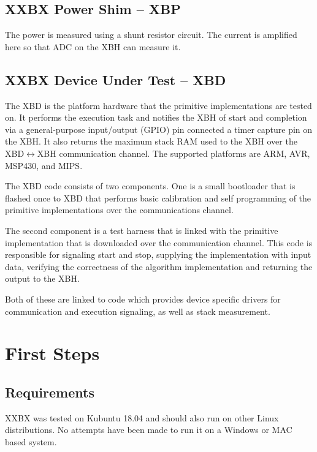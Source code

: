 \documentclass[twoside,11pt]{cergdoc}
\begin{document}
  \section{XXBX Power Shim -- XBP}
 The power is measured
using a shunt resistor circuit. The current is amplified
here so that ADC on the XBH can measure it.


  \section{XXBX Device Under Test -- XBD}
The XBD is the platform hardware that the primitive implementations are tested
on. It performs the execution task and
notifies the XBH of start and completion via a general-purpose input/output
(GPIO) pin connected a timer capture pin on the XBH. It also returns the maximum
stack RAM used to the XBH over the XBD$\leftrightarrow$XBH communication
    channel. The supported platforms are ARM, AVR, MSP430, and MIPS. 

The XBD code consists of two components. One is a small bootloader that is
flashed once to XBD that performs basic calibration and self programming of the
primitive implementations over the communications channel. 

The second component is a test harness that is linked with the
primitive implementation that is downloaded over the communication channel. This
code is responsible for signaling start and stop, supplying the implementation
with input data, verifying the correctness of the algorithm implementation and
returning the output to the XBH. 

Both of these are linked to code which provides device specific drivers for
communication and execution signaling, as well as stack measurement. 


\chapter{First Steps}
  \section{Requirements}
  XXBX was tested on Kubuntu 18.04 and should also run on other Linux distributions.
  No attempts have been made to run it on a Windows or MAC based system.
\end{document}
